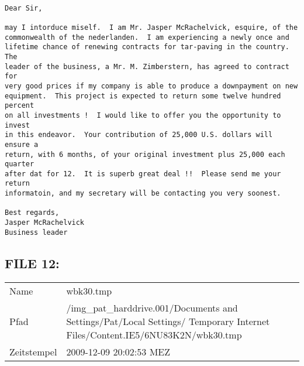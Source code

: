 \begin{lstlisting}

Dear Sir,

may I intorduce miself.  I am Mr. Jasper McRachelvick, esquire, of the 
commonwealth of the nederlanden.  I am experiencing a newly once and 
lifetime chance of renewing contracts for tar-paving in the country.  The 
leader of the business, a Mr. M. Zimberstern, has agreed to contract for 
very good prices if my company is able to produce a downpayment on new 
equipment.  This project is expected to return some twelve hundred percent 
on all investments !  I would like to offer you the opportunity to invest 
in this endeavor.  Your contribution of 25,000 U.S. dollars will ensure a 
return, with 6 months, of your original investment plus 25,000 each quarter 
after dat for 12.  It is superb great deal !!  Please send me your return 
informatoin, and my secretary will be contacting you very soonest.

Best regards,
Jasper McRachelvick
Business leader

\end{lstlisting}

\subsection{FILE 12:}	

\begin{table}[htb]
	\begin{tabular}{p{2cm} p{13.5cm}}
		Name & wbk30.tmp\\
		Pfad & /img_pat_harddrive.001/Documents and Settings/Pat/Local Settings/ Temporary Internet Files/Content.IE5/6NU83K2N/wbk30.tmp\\
		Zeitstempel & 2009-12-09 20:02:53 MEZ
	\end{tabular}
\end{table}	

